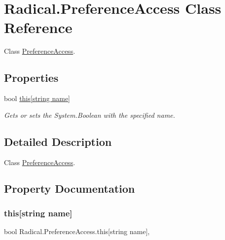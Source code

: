 \hypertarget{class_radical_1_1_preference_access}{}\section{Radical.\+Preference\+Access Class Reference}
\label{class_radical_1_1_preference_access}


Class \hyperlink{class_radical_1_1_preference_access}{Preference\+Access}.  


\subsection*{Properties}
\begin{DoxyCompactItemize}
\item 
bool \hyperlink{class_radical_1_1_preference_access_a4902b4cc8b1ce44cbf62e132123bdf10}{this\mbox{[}string name\mbox{]}}
\begin{DoxyCompactList}\small\item\em Gets or sets the System.\+Boolean with the specified name. \end{DoxyCompactList}\end{DoxyCompactItemize}


\subsection{Detailed Description}
Class \hyperlink{class_radical_1_1_preference_access}{Preference\+Access}. 



\subsection{Property Documentation}
\mbox{\label{class_radical_1_1_preference_access_a4902b4cc8b1ce44cbf62e132123bdf10}} 
\subsubsection{\texorpdfstring{this[string name]}{this[string name]}}
{\footnotesize\ttfamily bool Radical.\+Preference\+Access.\+this\mbox{[}string name\mbox{]}\hspace{0.3cm}{\ttfamily [get]}, {\ttfamily [set]}}



